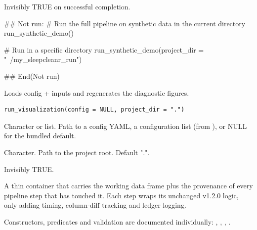 \documentclass[a4paper]{book}
\begin{document}
%
\begin{Value}
Invisibly TRUE on successful completion.
\end{Value}
%
\begin{Examples}
\begin{ExampleCode}
## Not run: 
  # Run the full pipeline on synthetic data in the current directory
  run_synthetic_demo()

  # Run in a specific directory
  run_synthetic_demo(project_dir = "~/my_sleepcleanr_run")

## End(Not run)
\end{ExampleCode}
\end{Examples}
%
\begin{Description}
Loads config + inputs and regenerates the diagnostic figures.
\end{Description}
%
\begin{Usage}
\begin{verbatim}
run_visualization(config = NULL, project_dir = ".")
\end{verbatim}
\end{Usage}
%
\begin{Arguments}
\begin{ldescription}
\item[\code{config}] Character or list. Path to a config YAML, a configuration
list (from ), or NULL for the bundled default.

\item[\code{project\_dir}] Character. Path to the project root. Default ".".
\end{ldescription}
\end{Arguments}
%
\begin{Value}
Invisibly TRUE.
\end{Value}
%
\begin{Description}
A thin container that carries the working data frame plus the provenance
of every pipeline step that has touched it.  Each step wraps its
unchanged v1.2.0 logic, only adding timing, column-diff tracking and
ledger logging.
\end{Description}
%
\begin{Details}
Constructors, predicates and validation are documented individually:
, ,
, .
\end{Details}
\end{document}
